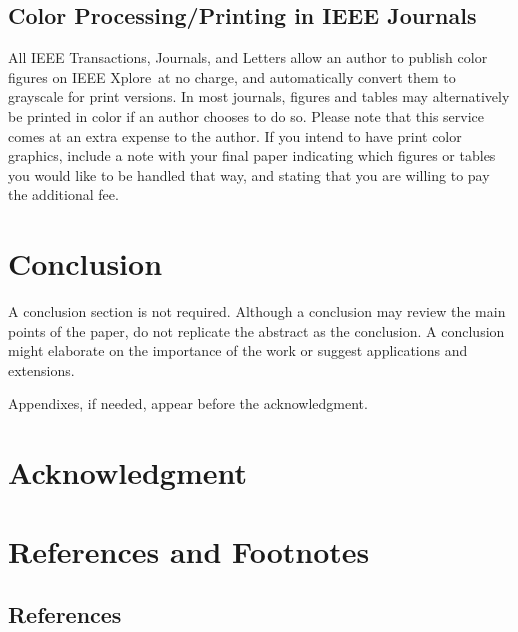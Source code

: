 \documentclass[journal,twoside,web]{ieeecolor}
\begin{document}
\subsection{Color Processing/Printing in IEEE Journals}
All IEEE Transactions, Journals, and Letters allow an author to publish 
color figures on IEEE Xplore\textregistered\ at no charge, and automatically 
convert them to grayscale for print versions. In most journals, figures and 
tables may alternatively be printed in color if an author chooses to do so. 
Please note that this service comes at an extra expense to the author. If 
you intend to have print color graphics, include a note with your final 
paper indicating which figures or tables you would like to be handled that 
way, and stating that you are willing to pay the additional fee.

\section{Conclusion}
A conclusion section is not required. Although a conclusion may review the 
main points of the paper, do not replicate the abstract as the conclusion. A 
conclusion might elaborate on the importance of the work or suggest 
applications and extensions. 

\appendices

Appendixes, if needed, appear before the acknowledgment.

\section*{Acknowledgment}



\section*{References and Footnotes}

\subsection{References}
\end{document}
